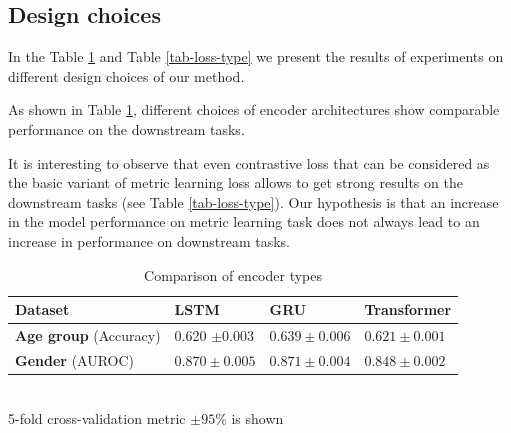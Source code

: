 \documentclass{article}
\begin{document}
\subsection{Design choices}

In the Table \ref{tab-enc-type} and Table \ref{tab-loss-type} we present the results of experiments on different design choices of our method.

As shown in Table \ref{tab-enc-type}, different choices of encoder architectures show comparable performance on the downstream tasks.

It is interesting to observe that even contrastive loss that can be considered as the basic variant of metric learning loss allows to get strong results on the downstream tasks (see Table \ref{tab-loss-type}). Our hypothesis is that an increase in the model performance on metric learning task does not always lead to an increase in performance on downstream tasks.

\begin{table}
\centering
\caption{Comparison of encoder types}
\begin{tabular}{llll}
\toprule
\textbf{Dataset} & \textbf{LSTM} & \textbf{GRU} & \textbf{Transformer} \\
\midrule
\textbf{Age group} \small{(Accuracy)} & 0.620 $\pm 0.003$ & $0.639 \pm 0.006$ & $0.621 \pm 0.001$ \\
\textbf{Gender} \small{(AUROC)} & $0.870 \pm 0.005$ & $0.871 \pm 0.004$ & $0.848 \pm 0.002$  \\
\bottomrule
\end{tabular} \\
\small{5-fold cross-validation metric $\pm 95\%$ is shown}
\label{tab-enc-type}
\end{table}
\end{document}
